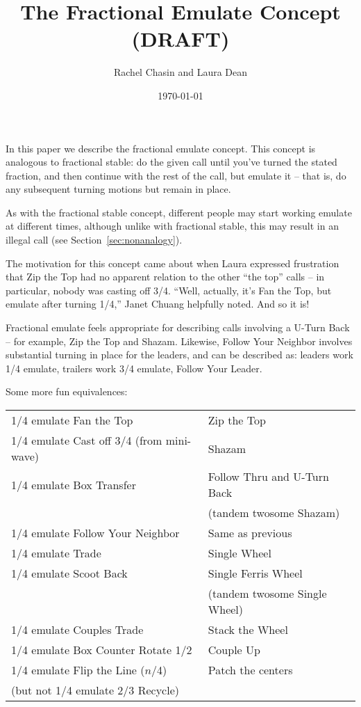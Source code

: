 \documentclass[11pt]{article}
\title{The Fractional Emulate Concept (DRAFT)}
\author{Rachel Chasin and Laura Dean}
\date{\today}
\begin{document}
\thispagestyle{empty}
\maketitle


In this paper we describe the fractional emulate concept. This concept
is analogous to fractional stable: do the given call until you've
turned the stated fraction, and then continue with the rest of the
call, but emulate it -- that is, do any subsequent turning motions 
but remain in place.

As with the fractional stable concept, different people may start
working emulate at different times, although unlike with fractional
stable, this may result in an illegal call (see
Section~\ref{sec:nonanalogy}).

The motivation for this concept came about when Laura expressed
frustration that Zip the Top had no apparent relation to the other
``the top'' calls -- in particular, nobody was casting off 3/4.
``Well, actually, it's Fan the Top, but emulate after turning 1/4,''
Janet Chuang helpfully noted.  And so it is!

Fractional emulate feels appropriate for describing calls
involving a U-Turn Back -- for example, Zip the Top and Shazam.
Likewise, Follow Your Neighbor involves substantial turning in place for the leaders,
and can be described as: leaders work 1/4 emulate,
trailers work 3/4 emulate, Follow Your Leader.

Some more fun equivalences:

\begin{tabular}{|l|l|}
\hline
1/4 emulate Fan the Top   & Zip the Top \\
1/4 emulate Cast off 3/4 (from mini-wave)  & Shazam \\
1/4 emulate Box Transfer & Follow Thru and U-Turn Back \\
& (tandem twosome Shazam) \\
1/4 emulate Follow Your Neighbor  & Same as previous\\
1/4 emulate Trade                          & Single Wheel \\
1/4 emulate Scoot Back  & Single Ferris Wheel \\
& (tandem twosome Single Wheel)\\
1/4 emulate Couples Trade  & Stack the Wheel \\
1/4 emulate Box Counter Rotate 1/2 & Couple Up \\
1/4 emulate Flip the Line ($n$/4) & Patch the centers \\
(but not 1/4 emulate 2/3 Recycle) & \\
\hline
\end{tabular}
\end{document}
